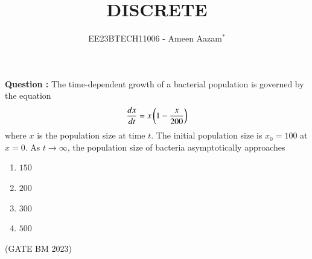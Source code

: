 \documentclass[journal,12pt,twocolumn]{IEEEtran}
\theoremstyle{remark}
\begin{document}

\vspace{3cm}

\title{DISCRETE}
\author{EE23BTECH11006 - Ameen Aazam$^{*}$%
}
\maketitle
\newpage
\bigskip

\renewcommand{\thefigure}{\theenumi}
\renewcommand{\thetable}{\theenumi}

\vspace{3cm}
\textbf{Question :}
The time-dependent growth of a bacterial population is governed by the equation
\begin{align}
    \frac{dx}{dt}=x\left(1-\frac{x}{200}\right)
\end{align}
where $x$ is the population size at time $t$. The initial population size is $x_0=100$
at $x=0$. As $t \rightarrow \infty$, the population size of bacteria asymptotically approaches
\begin{enumerate}[label=(\alph*)]
    \item $150$
    \item $200$
    \item $300$
    \item $500$
\end{enumerate}
\hfill{(GATE BM 2023)}
\end{document}
